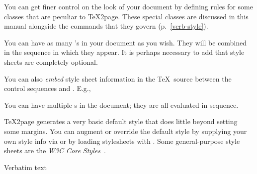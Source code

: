 
You can get finer control on the look of your document
by defining rules for some classes that are peculiar to
\TeX2page.  These special classes
are discussed in this manual alongside the commands
that they govern (p.~\ref{verb-style}).

You can have as many ’s in your
document as you wish.  They will be combined in
the sequence in which they appear.  It is perhaps
necessary to add that style sheets are completely
optional.


You can also {\em embed} style sheet information
in the \TeX\ source between the control sequences
\p{\cssblock} and \p{\endcssblock}.  E.g.,


\n You can
have multiple \p{\cssblock}s in the document; they
are all evaluated in sequence.

\TeX2page generates a very basic default style
that
does little beyond setting some margins.  You
can augment or override the default style by supplying your
own style info via \p{\cssblock} or by loading
stylesheets with .   Some general-purpose
style sheets are the {\em W3C Core
Styles}~\cite{w3ccorestyles}.

 Verbatim text

